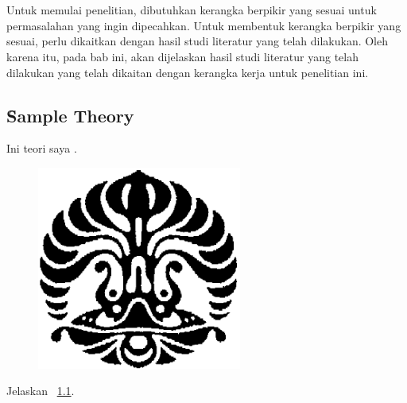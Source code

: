 \chapter{\babDua}
Untuk memulai penelitian, dibutuhkan kerangka berpikir yang sesuai untuk permasalahan yang ingin dipecahkan. Untuk membentuk kerangka berpikir yang sesuai, perlu dikaitkan dengan hasil studi literatur yang telah dilakukan. Oleh karena itu, pada bab ini, akan dijelaskan hasil studi literatur yang telah dilakukan yang telah dikaitan dengan kerangka kerja untuk penelitian ini.


\section{\f{Sample Theory}}
Ini teori saya \cite{book:test}.

\begin{figure}
	\centering
	\includegraphics[width=0.6\textwidth]{pics/makara.png}
	\label{fig:sample}
\end{figure}

Jelaskan \pic~\ref{fig:sample}.


